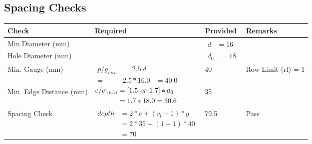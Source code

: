 \documentclass{article}%
\begin{document}
\subsection{Spacing Checks}%
\label{subsec:SpacingChecks}%
\renewcommand{\arraystretch}{1.2}%
\begin{longtable}{|p{2.5cm}|p{7.5cm}|p{3cm}|p{3cm}|}%
\hline%
\rowcolor{OsdagGreen}%
Check&Required&Provided&Remarks\\%
\hline%
\endhead%
\hline%
Min.Diameter (mm)&&$\begin{aligned} d &=16\end{aligned}$&\\%
\hline%
Hole Diameter (mm)& &$\begin{aligned} d_0 &=18\end{aligned}$&\\%
\hline%
Min. Gauge (mm)&$\begin{aligned}p/g_{min}&= 2.5 ~ d&\\ =&2.5*16.0&=40.0\end{aligned}$&40&Row Limit (rl) = 1\\%
\hline%
Min. Edge Distance (mm)&$\begin{aligned}e/e`_{min} &=[1.5~or~ 1.7] * d_0\\ &=1.7*18.0=30.6 \end{aligned}$&35&\\%
\hline%
Spacing Check&$\begin{aligned} depth & = 2 * e + (r_l -1) * g\\ & = 2 * 35+(1-1)*40\\ & = 70\end{aligned}$&79.5&Pass\\%
\hline%
\end{longtable}

%
\newpage%
\end{document}
